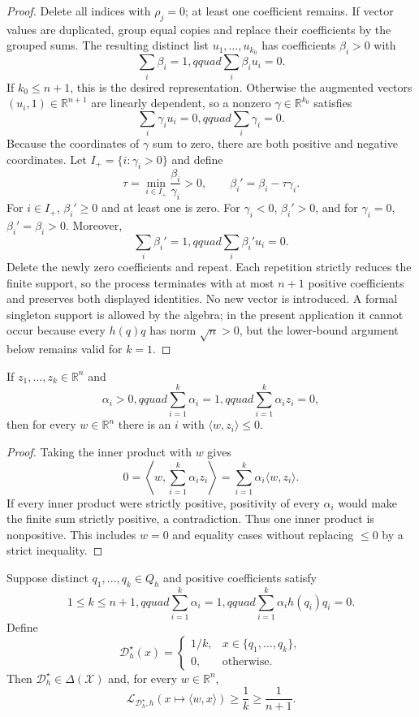 \begin{proof}
Delete all indices with $\rho_j=0$; at least one coefficient remains.
If vector values are duplicated, group equal copies and replace their
coefficients by the grouped sums.  The resulting distinct list
$u_1,\ldots,u_{k_0}$ has coefficients $\beta_i>0$ with
\[
\sum_i\beta_i=1,qquad\sum_i\beta_i u_i=0.
\]
If $k_0\leq n+1$, this is the desired representation.  Otherwise the
augmented vectors $(u_i,1)\in\mathbb R^{n+1}$ are linearly dependent, so a
nonzero $\gamma\in\mathbb R^{k_0}$ satisfies
\[
\sum_i\gamma_i u_i=0,qquad\sum_i\gamma_i=0.
\]
Because the coordinates of $\gamma$ sum to zero, there are both positive and
negative coordinates.  Let $I_+=\{i:\gamma_i>0\}$ and define
\[
 \tau=\min_{i\in I_+}\frac{\beta_i}{\gamma_i}>0,
 \qquad
 \beta_i'=\beta_i-\tau\gamma_i.
\]
For $i\in I_+$, $\beta_i'\geq0$ and at least one is zero.  For
$\gamma_i<0$, $\beta_i'>0$, and for $\gamma_i=0$, $\beta_i'=\beta_i>0$.
Moreover,
\[
\sum_i\beta_i'=1,qquad
\sum_i\beta_i'u_i=0.
\]
Delete the newly zero coefficients and repeat.  Each repetition strictly
reduces the finite support, so the process terminates with at most $n+1$
positive coefficients and preserves both displayed identities.  No new vector
is introduced.  A formal singleton support is allowed by the algebra; in the
present application it cannot occur because every $h(q)q$ has norm
$\sqrt n>0$, but the lower-bound argument below remains valid for $k=1$.
\end{proof}

\begin{lemma}
\label{lem:step-005-signed-cancellation}
If $z_1,\ldots,z_k\in\mathbb R^n$ and
\[
\alpha_i>0,qquad \sum_{i=1}^k\alpha_i=1,qquad
\sum_{i=1}^k\alpha_i z_i=0,
\]
then for every $w\in\mathbb R^n$ there is an $i$ with
$\langle w,z_i\rangle\leq0$.
\end{lemma}

\begin{proof}
Taking the inner product with $w$ gives
\[
0=\left\langle w,\sum_{i=1}^k\alpha_i z_i\right\rangle
=\sum_{i=1}^k\alpha_i\langle w,z_i\rangle.
\]
If every inner product were strictly positive, positivity of every
$\alpha_i$ would make the finite sum strictly positive, a contradiction.
Thus one inner product is nonpositive.  This includes $w=0$ and equality
cases without replacing $\leq0$ by a strict inequality.
\end{proof}

\begin{proposition}
\label{prop:step-005-uniform-obstruction}
Suppose distinct $q_1,\ldots,q_k\in Q_h$ and positive coefficients satisfy
\[
1\leq k\leq n+1,qquad \sum_{i=1}^k\alpha_i=1,qquad
\sum_{i=1}^k\alpha_i h(q_i)q_i=0.
\]
Define
\[
\mathcal D_h^\star(x)=
\begin{cases}
1/k,&x\in\{q_1,\ldots,q_k\},\\
0,&\text{otherwise}.
\end{cases}
\]
Then $\mathcal D_h^\star\in\Delta(\mathcal X)$ and, for every
$w\in\mathbb R^n$,
\[
\mathcal L_{\mathcal D_h^\star,h}(x\mapsto\langle w,x\rangle)
\geq\frac1k\geq\frac1{n+1}.
\]
\end{proposition}

